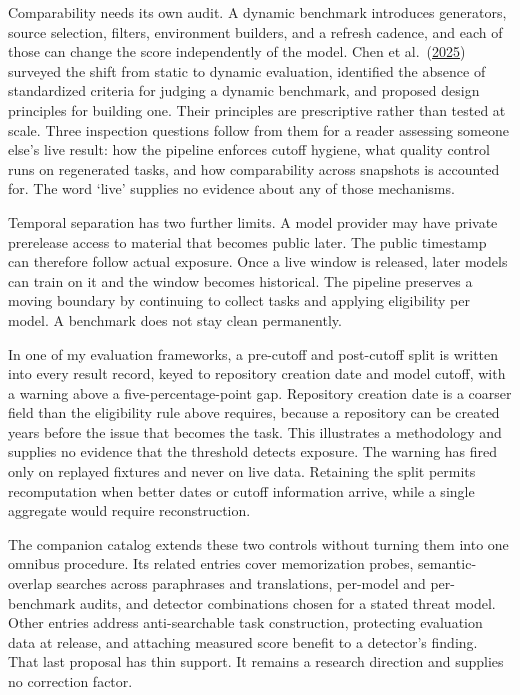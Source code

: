 Comparability needs its own audit. A dynamic benchmark introduces generators, source selection, filters, environment builders, and a refresh cadence, and each of those can change the score independently of the model. Chen et al.~(\href{https://arxiv.org/abs/2502.17521}{2025}) surveyed the shift from static to dynamic evaluation, identified the absence of standardized criteria for judging a dynamic benchmark, and proposed design principles for building one. Their principles are prescriptive rather than tested at scale. Three inspection questions follow from them for a reader assessing someone else's live result: how the pipeline enforces cutoff hygiene, what quality control runs on regenerated tasks, and how comparability across snapshots is accounted for. The word `live' supplies no evidence about any of those mechanisms.

Temporal separation has two further limits. A model provider may have private prerelease access to material that becomes public later. The public timestamp can therefore follow actual exposure. Once a live window is released, later models can train on it and the window becomes historical. The pipeline preserves a moving boundary by continuing to collect tasks and applying eligibility per model. A benchmark does not stay clean permanently.

In one of my evaluation frameworks, a pre-cutoff and post-cutoff split is written into every result record, keyed to repository creation date and model cutoff, with a warning above a five-percentage-point gap. Repository creation date is a coarser field than the eligibility rule above requires, because a repository can be created years before the issue that becomes the task. This illustrates a methodology and supplies no evidence that the threshold detects exposure. The warning has fired only on replayed fixtures and never on live data. Retaining the split permits recomputation when better dates or cutoff information arrive, while a single aggregate would require reconstruction.

The companion catalog extends these two controls without turning them into one omnibus procedure. Its related entries cover memorization probes, semantic-overlap searches across paraphrases and translations, per-model and per-benchmark audits, and detector combinations chosen for a stated threat model. Other entries address anti-searchable task construction, protecting evaluation data at release, and attaching measured score benefit to a detector's finding. That last proposal has thin support. It remains a research direction and supplies no correction factor.

